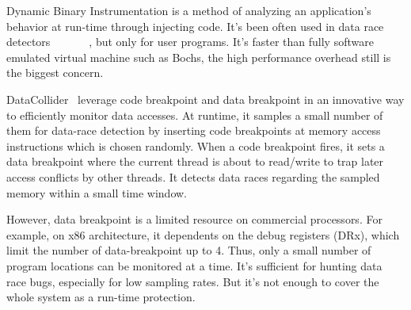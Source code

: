 Dynamic Binary Instrumentation is a method of analyzing an application's behavior at run-time through injecting code. It's been often used in data race detectors~\cite{savage1997eraser}~\cite{o2003hybrid}~\cite{yu2005racetrack}~\cite{bond2010pacer}~\cite{marino2009literace}~\cite{flanagan2009fasttrack}~\cite{pozniansky2007multirace}, but only for user programs. It's faster than fully software emulated virtual machine such as Bochs, the high performance overhead still is the biggest concern.   

DataCollider~\cite{erickson2010effective} leverage code breakpoint and data breakpoint in an innovative way to efficiently monitor data accesses. At runtime, it samples a small number of them for data-race detection by inserting code breakpoints at memory access instructions which is chosen randomly. When a code breakpoint fires, it sets a data breakpoint where the current thread is about to read/write to trap later access conflicts by other threads. It detects data races regarding the sampled memory within a small time window.

However, data breakpoint is a limited resource on commercial processors. For example, on x86 architecture, it dependents on the debug registers (DRx), which limit the number of data-breakpoint up to 4. Thus, only a small number of program locations can be monitored at a time. It's sufficient for hunting data race bugs, especially for low sampling rates. But it's not enough to cover the whole system as a run-time protection.
